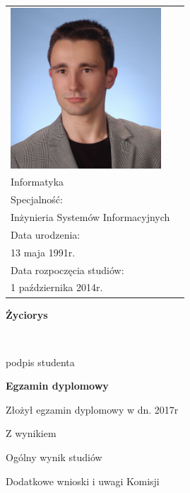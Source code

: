 \newpage\thispagestyle{empty}
  \begin{tabular}{p{6cm} p{8cm}}
  \begin{minipage}{7cm}
  \includegraphics[height=6cm, keepaspectratio]{img/author-photo.jpg}
  \end{minipage}
  &
  \begin{minipage}{8cm}
  Kierunek: \\[\smallskipamount]
  {\large Informatyka}\\[0.2cm]
  Specjalność: \\[\smallskipamount]
  {\large Inżynieria Systemów Informacyjnych}\\[0.2cm]
  Data urodzenia: \\[\smallskipamount]
  {\large 13 maja 1991r.}\\[0.2cm]
  Data rozpoczęcia studiów: \\[\smallskipamount]
  {\large 1 października 2014r.}
  \end{minipage}
  \end{tabular}
  \vspace*{1\baselineskip}
  \begin{center}
  {\large\bfseries Życiorys}\par\bigskip
  \end{center}

  \indent

  \vspace{2\baselineskip}
  \hfill\parbox{15em}{{\small\dotfill}\\[-.3ex]
  \centerline{\footnotesize podpis studenta}}\par
  \vspace{2\baselineskip}
  \begin{center}
  {\large\bfseries Egzamin dyplomowy} \par\bigskip\bigskip
  \end{center}
  \par\noindent\vspace{1.5\baselineskip}
  Złożył egzamin dyplomowy w dn. \dotfill 2017r
  \par\noindent\vspace{1.5\baselineskip}
  Z wynikiem \dotfill
  \par\noindent\vspace{1.5\baselineskip}
  Ogólny wynik studiów \dotfill
  \par\noindent\vspace{1.5\baselineskip}
  Dodatkowe wnioski i uwagi Komisji \dotfill
  \par\noindent\vspace{1.5\baselineskip}
  \dotfill